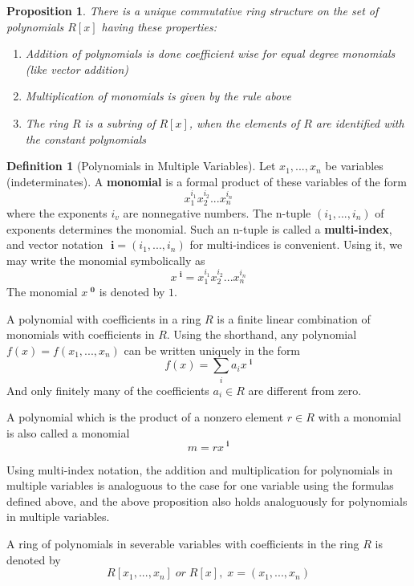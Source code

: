 \documentclass[12pt]{article}
\newtheorem{prop}[thm]{Proposition}
\theoremstyle{definition}
\newtheorem{defn}[thm]{Definition}
\theoremstyle{remark}
\numberwithin{equation}{section}
\newcommand\B[1]{\textbf{ #1}}
\begin{document}
\begin{prop}
        There is a unique commutative ring structure on the set of polynomials $R[x]$ having these properties:\begin{enumerate}
                \item Addition of polynomials is done coefficient wise for equal degree monomials (like vector addition)
                \item Multiplication of monomials is given by the rule above
                \item The ring $R$ is a subring of $R[x]$, when the elements of $R$ are identified with the constant polynomials
        \end{enumerate}
\end{prop}


\vspace{15pt}

\begin{defn}[Polynomials in Multiple Variables]
        Let $x_1,...,x_n$ be variables (indeterminates). A \B{monomial} is a formal product of these variables of the form \begin{equation}
                x_1^{i_1}x_2^{i_2}...x_n^{i_n}
        \end{equation}
        where the exponents $i_v$ are nonnegative numbers. The n-tuple $(i_1,...,i_n)$ of exponents determines the monomial. Such an n-tuple is called a \B{multi-index}, and vector notation $\B{i} = (i_1,...,i_n)$ for multi-indices is convenient. Using it, we may write the monomial symbolically as \begin{equation}
                x^{\B{i}}=x_1^{i_1}x_2^{i_2}...x_n^{i_n}
        \end{equation}
        The monomial $x^{\B{0}}$ is denoted by $1$.


        A polynomial with coefficients in a ring $R$ is a finite linear combination of monomials with coefficients in $R$. Using the shorthand, any polynomial $f(x) = f(x_1,...,x_n)$ can be written uniquely in the form \begin{equation}
                f(x) = \sum\limits_{i} a_{i}x^{\B{i}}
        \end{equation}
        And only finitely many of the coefficients $a_i \in R$ are different from zero.


        A polynomial which is the product of a nonzero element $r \in R$ with a monomial is also called a monomial \begin{equation}
                m=rx^{\B{i}}
        \end{equation}


        Using multi-index notation, the addition and multiplication for polynomials in multiple variables is analoguous to the case for one variable using the formulas defined above, and the above proposition also holds analoguously for polynomials in multiple variables. 

        A ring of polynomials in severable variables with coefficients in the ring $R$ is denoted by \begin{equation}
                R[x_1,...,x_n]\;or\;R[x],\;x=(x_1,...,x_n)
        \end{equation}
\end{defn}
\end{document}
